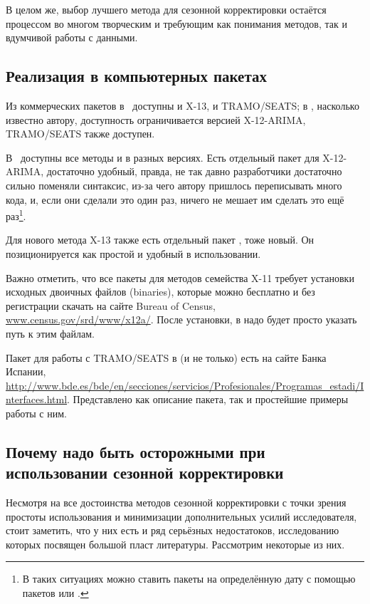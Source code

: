 \documentclass[final,pdftex]{../../template/epsilonj}\usepackage[]{graphicx}\usepackage[]{color}
\begin{document}
В целом же, выбор лучшего метода для сезонной корректировки остаётся процессом во многом творческим и требующим как понимания методов, так и вдумчивой работы с данными. 

\subsection{Реализация в компьютерных пакетах}

Из коммерческих пакетов в~ доступны и X-13, и TRAMO/SEATS; в , насколько известно автору, доступность ограничивается версией X-12-ARIMA, TRAMO/SEATS также доступен. 

В~ доступны все методы и в разных версиях. Есть отдельный пакет  для X-12-ARIMA,
достаточно удобный, правда, не так давно разработчики достаточно сильно поменяли синтаксис, из-за чего автору пришлось переписывать много кода, и, если они сделали это один раз, ничего не мешает им сделать это ещё раз\footnote{В таких ситуациях можно ставить пакеты  на определённую дату с помощью пакетов  или .}. 

Для нового метода X-13 также есть отдельный пакет ,
тоже новый. Он позиционируется как простой и удобный в использовании. 

Важно отметить, что все пакеты для методов семейства X-11 требует установки исходных двоичных файлов (binaries), которые можно бесплатно и без регистрации скачать на сайте Bureau of Census, \href{http://www.census.gov/srd/www/x12a/}{www.census.gov/srd/www/x12a/}. После установки, в  надо будет просто указать путь к этим файлам. 

Пакет для работы с TRAMO/SEATS в   (и не только) есть на сайте Банка Испании, \url{http://www.bde.es/bde/en/secciones/servicios/Profesionales/Programas_estadi/Interfaces.html}. Представлено как описание пакета, так и простейшие примеры работы с ним. 

\subsection{Почему надо быть осторожными при использовании сезонной корректировки}

Несмотря на все достоинства методов сезонной корректировки с точки зрения простоты использования и минимизации дополнительных усилий исследователя, стоит заметить, что у них есть и ряд серьёзных недостатоков, исследованию которых посвящен большой пласт литературы. Рассмотрим некоторые из них. 
\end{document}
